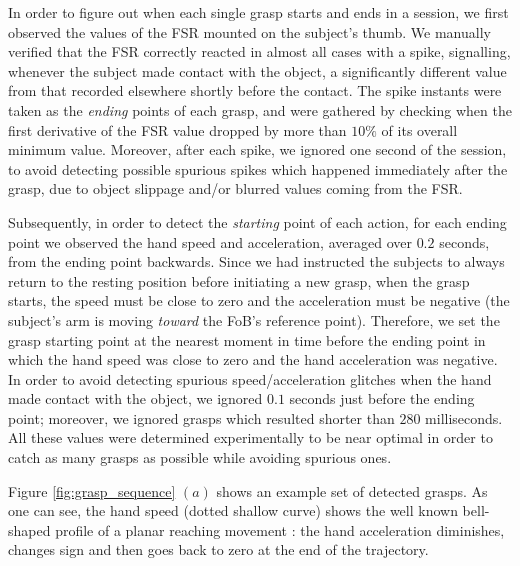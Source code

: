 In order to figure out when each single grasp starts and ends in a
session, we first observed the values of the FSR mounted on the
subject's thumb. We manually verified that the FSR correctly reacted
in almost all cases with a spike, signalling, whenever the subject
made contact with the object, a significantly different value from
that recorded elsewhere shortly before the contact. The spike instants
were taken as the \emph{ending} points of each grasp, and were
gathered by checking when the first derivative of the FSR value
dropped by more than $10\%$ of its overall minimum value. Moreover,
after each spike, we ignored one second of the session, to avoid 
detecting possible spurious spikes which happened immediately after
the grasp, due to object slippage and/or blurred values coming from
the FSR.

Subsequently, in order to detect the \emph{starting} point of each
action, for each ending point we observed the hand speed and
acceleration, averaged over $0.2$ seconds, from the ending point
backwards. Since we had instructed the subjects to always return to
the resting position before initiating a new grasp, when the grasp
starts, the speed must be close to zero and the acceleration must be
negative (the subject's arm is moving \emph{toward} the FoB's
reference point). Therefore, we set the grasp starting point at the
nearest moment in time before the ending point in which the hand speed
was close to zero and the hand acceleration was negative. In order to
avoid detecting spurious speed/acceleration glitches when the hand
made contact with the object, we ignored $0.1$ seconds just before the
ending point; moreover, we ignored grasps which resulted shorter than
$280$ milliseconds. All these values were determined experimentally to
be near optimal in order to catch as many grasps as possible while
avoiding spurious ones.

Figure \ref{fig:grasp_sequence} $(a)$ shows an example set of detected
grasps. As one can see, the hand speed (dotted shallow curve) shows
the well known bell-shaped profile of a planar reaching movement
\cite{morasso-81}: the hand acceleration diminishes, changes sign and
then goes back to zero at the end of the trajectory.

